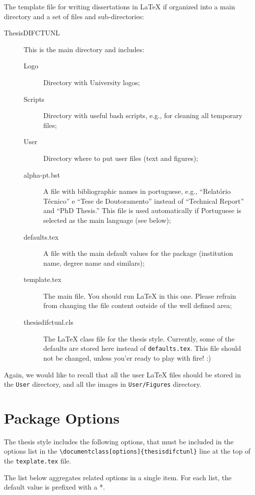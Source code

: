 The template file for writing dissertations in \LaTeX{} if organized into a main directory and a set of files and sub-directories:
\begin{description}
	\item[ThesisDIFCTUNL] This is the main directory and includes:
	\begin{description}
		\item[Logo] Directory with University logos;
		\item[Scripts] Directory with useful bash scripts, e.g., for cleaning all temporary files;
		\item[User] Directory where to put user files (text and figures);
		\item[alpha-pt.bst] A file with bibliographic names in portuguese, e.g., ``Relatório Técnico'' e ``Tese de Doutoramento'' instead of ``Technical Report'' and ``PhD Thesis.'' This file is used automatically if Portuguese is selected as the main language (see below);
		\item[defaults.tex] A file with the main default values for the package (institution name, degree name and similars);
		\item[template.tex] The main file. You should run \LaTeX{} in this one. Please refrain from changing the file content outside of the well defined area;
		\item[thesisdifctunl.cls] The \LaTeX{} class file for the thesis{} style. Currently, some of the defaults are stored here instead of \texttt{defaults.tex}. This file should not be changed, unless you'er ready to play with fire! :)
	\end{description}
\end{description}

Again, we would like to recall that all the user \LaTeX{} files should be stored in the \texttt{User} directory, and all the images in \texttt{User/Figures} directory.

\section{Package Options} %
\label{sec:package_options}

The thesis{} style includes the following options, that must be included in the options list in the \verb!\documentclass[options]{thesisdifctunl}! line at the top of the \texttt{texplate.tex} file.

The list below aggregates related options in a single item. For each list, the default value is prefixed with a *.

